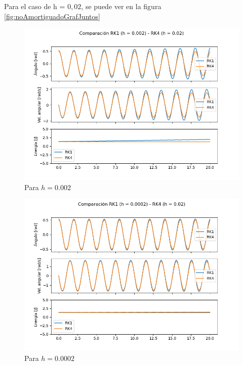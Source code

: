 \documentclass[titlepage,a4paper]{article}
\begin{document}
    Para el caso de h = $0,02$, se puede ver en la figura \ref{fig:noAmortiguadoGrafJuntos}
    
    \begin{figure}[!htb]
        \centering
        \includegraphics[scale = 0.6]{ambosjuntos 0,002.png}
        \caption{Para $h = 0.002$}
        \label{fig:errorH2}
    \end{figure}
    
    \begin{figure}[!htb]
        \centering
        \includegraphics[scale = 0.6]{ambosjuntos 0,0002.png}
        \caption{Para $h = 0.0002$}

    \end{figure}
    
\end{document}
